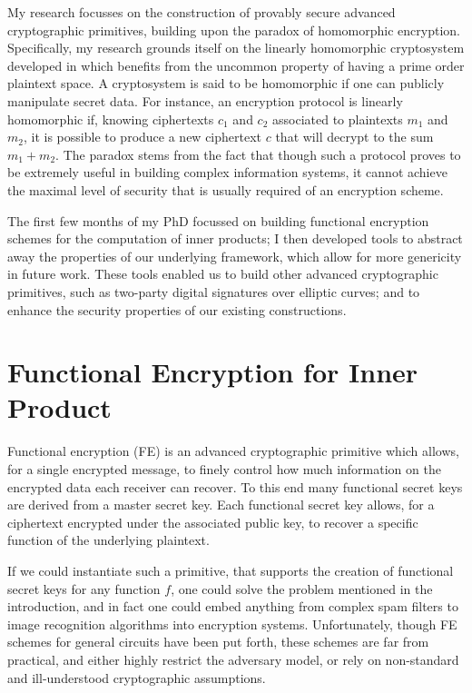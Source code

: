 \documentclass[10pt]{llncs}
\begin{document}
My research focusses on the construction of provably secure advanced cryptographic primitives, building upon the paradox of homomorphic encryption. Specifically, my research grounds itself on the linearly homomorphic cryptosystem developed in \cite{RSA:CasLag15} which benefits from the uncommon property of having a prime order plaintext space.
A cryptosystem is said to be homomorphic if one can publicly manipulate secret data. For instance, an encryption protocol is linearly homomorphic if, knowing ciphertexts $c_1$ and $c_2$ associated to plaintexts $m_1$ and $m_2$, it is possible to produce a new ciphertext $c$ that will decrypt to the sum $m_1+m_2$. The paradox stems from the fact that though such a protocol proves to be extremely useful in building complex information systems, it cannot achieve the maximal level of security that is usually required of an encryption scheme.
%

The first few months of my PhD focussed on building functional encryption schemes for the computation of inner products;
%
I then developed tools to abstract away the properties of our underlying framework, which allow for more genericity in future work. These tools enabled us to build other advanced cryptographic primitives, such as two-party digital signatures over elliptic curves; and to enhance the security properties of our existing constructions.

\section{Functional Encryption for Inner Product}
Functional encryption (FE)
\cite{TCC:BonSahWat11,EPRINT:ONeill10b} is an advanced cryptographic primitive which allows, for a single encrypted message, to finely control how much information on the encrypted data each receiver can recover. To this end many functional secret keys are derived from a master secret key. Each functional secret key allows, for a ciphertext encrypted under the associated public key, to recover a specific function of the underlying plaintext. 

If we could instantiate such a primitive, that supports the creation of functional secret keys for any function $f$, one could solve the problem mentioned in the introduction, and in fact one could embed anything from complex spam filters to image recognition algorithms into encryption systems.
%
%
Unfortunately, though FE schemes for general circuits have been put forth, these schemes are far from practical, and either highly restrict the adversary model, or rely on non-standard and ill-understood cryptographic assumptions.
\end{document}

